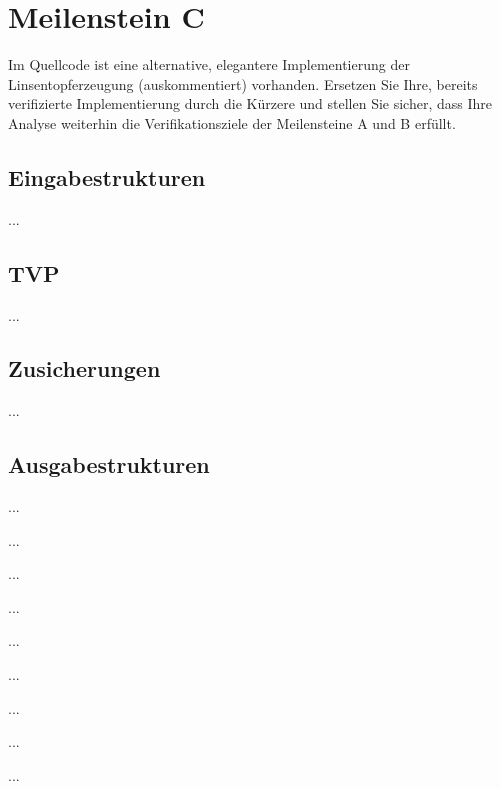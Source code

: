 \section{Meilenstein C}
Im Quellcode ist eine alternative, elegantere Implementierung der Linsentopferzeugung (auskommentiert) vorhanden. Ersetzen Sie Ihre, bereits verifizierte Implementierung durch die Kürzere und stellen Sie sicher, dass Ihre Analyse weiterhin die Verifikationsziele der Meilensteine A und B erfüllt.


\subsection{Eingabestrukturen}
...


\subsection{TVP}
...


\subsection{Zusicherungen}
...


\subsection{Ausgabestrukturen}
...

\begin{description}
	\item ... 
	\item ... 
	\item ... 
	\item ... 
	\item ... 
	\item ... 
	\item ... 
	\item ... 
\end{description}